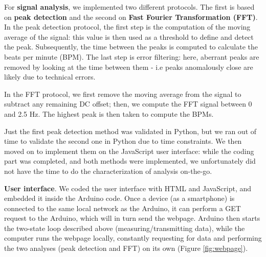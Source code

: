 \documentclass[conference]{IEEEtran}
\begin{document}
      For \textbf{signal analysis}, we implemented two different protocols. The first is based on \textbf{peak detection} and the second on \textbf{Fast Fourier Transformation (FFT)}. In the peak detection protocol, the first step is the computation of the moving average of the signal: this value is then used as a threshold to define and detect the peak. Subsequently, the time between the peaks is computed to calculate the beats per minute (BPM). The last step is error filtering: here, aberrant peaks are removed by looking at the time between them - i.e peaks anomalously close are likely due to technical errors. 
      
      In the FFT protocol, we first remove the moving average from the signal to subtract any remaining DC offset; then, we compute the FFT signal between 0 and 2.5 Hz. The highest peak is then taken to compute the BPMs.
      
      
      Just the first peak detection method was validated in Python, but we ran out of time to validate the second one in Python due to time constraints. We then moved on to implement them on the JavaScript user interface: while the coding part was completed, and both methods were implemented, we unfortunately did not have the time to do the characterization of analysis on-the-go.  
      
      \textbf{User interface}. We coded the user interface with HTML and JavaScript, and embedded it inside the Arduino code. Once a device (as a smartphone) is connected to the same local network as the Arduino, it can perform a GET request to the Arduino, which will in turn send the webpage. Arduino then starts the two-state loop described above (measuring/transmitting data), while the computer runs the webpage locally, constantly requesting for data and performing the two analyses (peak detection and FFT) on its own (Figure \ref{fig:webpage}).
 
\end{document}
